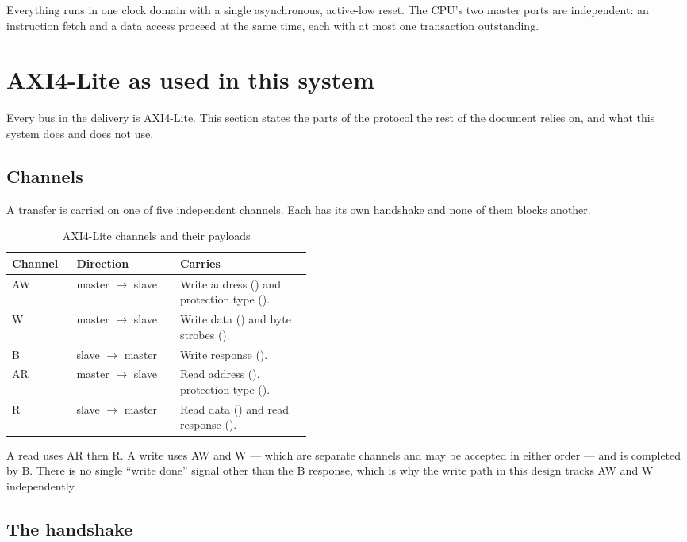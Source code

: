 Everything runs in one clock domain with a single asynchronous, active-low reset.
The CPU's two master ports are independent: an instruction fetch and a data
access proceed at the same time, each with at most one transaction outstanding.

\section{AXI4-Lite as used in this system}
\label{sec:axiprimer}

Every bus in the delivery is AXI4-Lite. This section states the parts of the
protocol the rest of the document relies on, and what this system does and does
not use.

\subsection{Channels}

A transfer is carried on one of five independent channels. Each has its own
handshake and none of them blocks another.

\begin{table}[H]
\centering
\caption{AXI4-Lite channels and their payloads}
\label{tab:axichan}
\begin{tabular}{@{}llL{0.44\linewidth}@{}}
\toprule
\textbf{Channel} & \textbf{Direction} & \textbf{Carries} \\
\midrule
AW & master $\to$ slave & Write address () and protection type (). \\
W  & master $\to$ slave & Write data () and byte strobes (). \\
B  & slave $\to$ master & Write response (). \\
AR & master $\to$ slave & Read address (), protection type (). \\
R  & slave $\to$ master & Read data () and read response (). \\
\bottomrule
\end{tabular}
\end{table}

A read uses AR then R. A write uses AW and W --- which are separate channels and
may be accepted in either order --- and is completed by B. There is no single
``write done'' signal other than the B response, which is why the write path in
this design tracks AW and W independently.

\subsection{The handshake}

